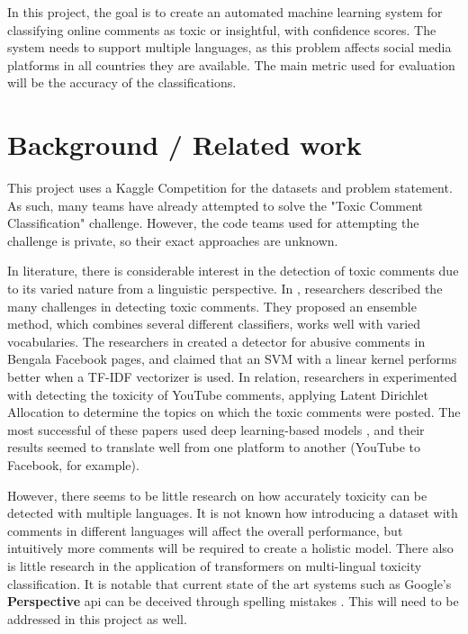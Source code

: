 \documentclass{article}
\begin{document}
In this project, the goal is to create an automated machine learning system for classifying online comments as toxic or insightful, with confidence scores. The system needs to support multiple languages, as this problem affects social media platforms in all countries they are available. The main metric used for evaluation will be the accuracy of the classifications.

\section{Background / Related work}

This project uses a Kaggle Competition \cite{kaggle_competition} for the datasets and problem statement. As such, many teams have already attempted to solve the "Toxic Comment Classification" challenge. However, the code teams used for attempting the challenge is private, so their exact approaches are unknown.

In literature, there is considerable interest in the detection of toxic comments \cite{almerekhi2019detecting} due to its varied nature from a linguistic perspective. In \cite{vanaken2018challenges}, researchers described the many challenges in detecting toxic comments. They proposed an ensemble method, which combines several different classifiers, works well with varied vocabularies. The researchers in \cite{8660863} created a detector for abusive comments in Bengala Facebook pages, and claimed that an SVM with a linear kernel performs better when a TF-IDF vectorizer is used. In relation, researchers in \cite{obadimu2019identifying} experimented with detecting the toxicity of YouTube comments, applying Latent Dirichlet Allocation to determine the topics on which the toxic comments were posted. The most successful of these papers used deep learning-based models \cite{deep_learning_approaches}, and their results seemed to translate well from one platform to another (YouTube to Facebook, for example).

However, there seems to be little research on how accurately toxicity can be detected with multiple languages. It is not known how introducing a dataset with comments in different languages will affect the overall performance, but intuitively more comments will be required to create a holistic model. There also is little research in the application of transformers on multi-lingual toxicity classification. It is notable that current state of the art systems such as Google's \textbf{Perspective} api can be deceived through spelling mistakes \cite{hosseini2017deceiving}. This will need to be addressed in this project as well.
\end{document}
